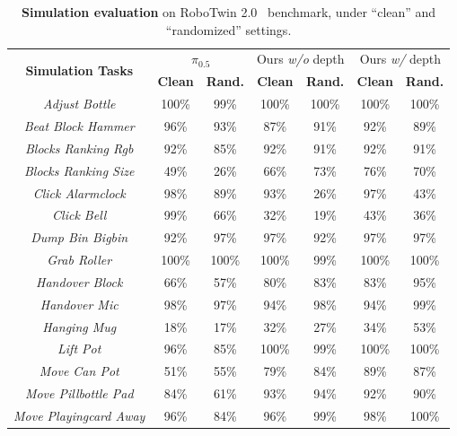 \begin{table}[t]
  \centering
  \caption{\textbf{Simulation evaluation} on RoboTwin 2.0~\cite{robotwin2} benchmark, under ``clean'' and ``randomized'' settings.}
  \small
  \setlength{\tabcolsep}{15.5pt}
    \begin{tabular}{ccccccc}
    \toprule
    \multicolumn{1}{c}{\multirow{2}[2]{*}{\textbf{Simulation Tasks}}} & \multicolumn{2}{c}{\textbf{$\pi_{0.5}$}} & \multicolumn{2}{c}{Ours \textit{w/o} depth} & \multicolumn{2}{c}{Ours \textit{w/} depth} \\
          & \textbf{Clean} & \textbf{Rand.} & \textbf{Clean} & \textbf{Rand.} & \textbf{Clean} & \textbf{Rand.} \\
    \midrule
    \textit{Adjust Bottle} & 100\%   & 99\%    & 100\%   & 100\%   & 100\%   & 100\% \\
    \textit{Beat Block Hammer} & 96\%    & 93\%    & 87\%    & 91\%    & 92\%    & 89\% \\
    \textit{Blocks Ranking Rgb} & 92\%    & 85\%    & 92\%    & 91\%    & 92\%    & 91\% \\
    \textit{Blocks Ranking Size} & 49\%    & 26\%    & 66\%    & 73\%    & 76\%    & 70\% \\
    \textit{Click Alarmclock} & 98\%    & 89\%    & 93\%    & 26\%    & 97\%    & 43\% \\
    \textit{Click Bell} & 99\%    & 66\%    & 32\%    & 19\%    & 43\%    & 36\% \\
    \textit{Dump Bin Bigbin} & 92\%    & 97\%    & 97\%    & 92\%    & 97\%    & 97\% \\
    \textit{Grab Roller} & 100\%   & 100\%   & 100\%   & 99\%    & 100\%   & 100\% \\
    \textit{Handover Block} & 66\%    & 57\%    & 80\%    & 83\%    & 83\%    & 95\% \\
    \textit{Handover Mic} & 98\%    & 97\%    & 94\%    & 98\%    & 94\%    & 99\% \\
    \textit{Hanging Mug} & 18\%    & 17\%    & 32\%    & 27\%    & 34\%    & 53\% \\
    \textit{Lift Pot} & 96\%    & 85\%    & 100\%   & 99\%    & 100\%   & 100\% \\
    \textit{Move Can Pot} & 51\%    & 55\%    & 79\%    & 84\%    & 89\%    & 87\% \\
    \textit{Move Pillbottle Pad} & 84\%    & 61\%    & 93\%    & 94\%    & 92\%    & 90\% \\
    \textit{Move Playingcard Away} & 96\%    & 84\%    & 96\%    & 99\%    & 98\%    & 100\% \\

\end{tabular}
\end{table}
